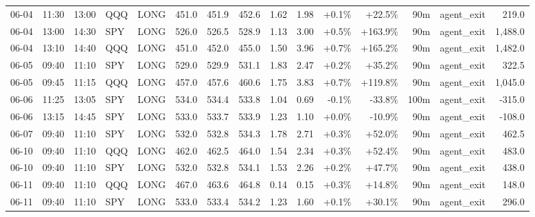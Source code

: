 \documentclass[11pt,a4paper,twoside]{article}
\begin{document}
\begin{landscape}
\begin{center}
\begin{longtable}{>{\color{txtmain}}l l l l l r r r r r r r r >{\color{txtmain}}l r}
06-04 & 11:30 & 13:00 & QQQ & LONG & 451.0 & 451.9 & 452.6 & 1.62 & 1.98 & \textcolor{wingreen}{+0.1\%} & \textcolor{wingreen}{+22.5\%} & 90m & agent\_exit & \textcolor{wingreen}{219.0} \\
06-04 & 13:00 & 14:30 & SPY & LONG & 526.0 & 526.5 & 528.9 & 1.13 & 3.00 & \textcolor{wingreen}{+0.5\%} & \textcolor{wingreen}{+163.9\%} & 90m & agent\_exit & \textcolor{wingreen}{1,488.0} \\
06-04 & 13:10 & 14:40 & QQQ & LONG & 451.0 & 452.0 & 455.0 & 1.50 & 3.96 & \textcolor{wingreen}{+0.7\%} & \textcolor{wingreen}{+165.2\%} & 90m & agent\_exit & \textcolor{wingreen}{1,482.0} \\
06-05 & 09:40 & 11:10 & SPY & LONG & 529.0 & 529.9 & 531.1 & 1.83 & 2.47 & \textcolor{wingreen}{+0.2\%} & \textcolor{wingreen}{+35.2\%} & 90m & agent\_exit & \textcolor{wingreen}{322.5} \\
06-05 & 09:45 & 11:15 & QQQ & LONG & 457.0 & 457.6 & 460.6 & 1.75 & 3.83 & \textcolor{wingreen}{+0.7\%} & \textcolor{wingreen}{+119.8\%} & 90m & agent\_exit & \textcolor{wingreen}{1,045.0} \\
06-06 & 11:25 & 13:05 & SPY & LONG & 534.0 & 534.4 & 533.8 & 1.04 & 0.69 & \textcolor{lossred}{-0.1\%} & \textcolor{lossred}{-33.8\%} & 100m & agent\_exit & \textcolor{lossred}{-315.0} \\
06-06 & 13:15 & 14:45 & SPY & LONG & 533.0 & 533.7 & 533.9 & 1.23 & 1.10 & \textcolor{wingreen}{+0.0\%} & \textcolor{lossred}{-10.9\%} & 90m & agent\_exit & \textcolor{lossred}{-108.0} \\
06-07 & 09:40 & 11:10 & SPY & LONG & 532.0 & 532.8 & 534.3 & 1.78 & 2.71 & \textcolor{wingreen}{+0.3\%} & \textcolor{wingreen}{+52.0\%} & 90m & agent\_exit & \textcolor{wingreen}{462.5} \\
06-10 & 09:40 & 11:10 & QQQ & LONG & 462.0 & 462.5 & 464.0 & 1.54 & 2.34 & \textcolor{wingreen}{+0.3\%} & \textcolor{wingreen}{+52.4\%} & 90m & agent\_exit & \textcolor{wingreen}{483.0} \\
06-10 & 09:40 & 11:10 & SPY & LONG & 532.0 & 532.8 & 534.1 & 1.53 & 2.26 & \textcolor{wingreen}{+0.2\%} & \textcolor{wingreen}{+47.7\%} & 90m & agent\_exit & \textcolor{wingreen}{438.0} \\
06-11 & 09:40 & 11:10 & QQQ & LONG & 467.0 & 463.6 & 464.8 & 0.14 & 0.15 & \textcolor{wingreen}{+0.3\%} & \textcolor{wingreen}{+14.8\%} & 90m & agent\_exit & \textcolor{wingreen}{148.0} \\
06-11 & 09:40 & 11:10 & SPY & LONG & 533.0 & 533.4 & 534.2 & 1.23 & 1.60 & \textcolor{wingreen}{+0.1\%} & \textcolor{wingreen}{+30.1\%} & 90m & agent\_exit & \textcolor{wingreen}{296.0} \\

\end{longtable}
\end{center}
\end{landscape}
\end{document}
